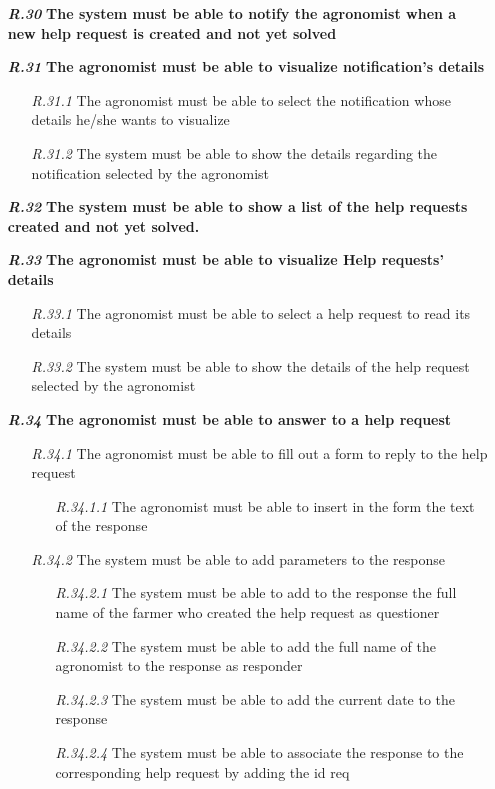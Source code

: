 \begin{itemize}
\item [\textbf{\textit{R.30}}] \textbf{The system must be able to notify the agronomist when a new help request is created and not yet solved}
\item [\textbf{\textit{R.31}}] \textbf{The agronomist must be able to visualize notification’s details}
        \begin{itemize}
            \item [\textit{R.31.1}] The agronomist must be able to select the notification whose details he/she wants to visualize
            \item [\textit{R.31.2}] The system must be able to show the details regarding the notification selected by the agronomist
        \end{itemize}
        \item [\textbf{\textit{R.32}}] \textbf{The system must be able to show a list of the help requests created and not yet solved.}
        \item [\textbf{\textit{R.33}}]\textbf{ The agronomist must be able to visualize Help requests' details}
        \begin{itemize}
            \item [\textit{R.33.1}] The agronomist must be able to select a help request to read its details
            \item [\textit{R.33.2}] The system must be able to show the details of the help request selected by the agronomist
        \end{itemize}
        \item [\textbf{\textit{R.34}}] \textbf{The agronomist must be able to answer to a help request}
        \begin{itemize}
            \item [\textit{R.34.1}] The agronomist must be able to fill out a form to reply to the help request
            \begin{itemize}
                \item [\textit{R.34.1.1}] The agronomist must be able to insert in the form the text of the response
            \end{itemize}
            \item [\textit{R.34.2}] The system must be able to add parameters to the response
            \begin{itemize}
                \item [\textit{R.34.2.1}] The system must be able to add to the response the full name of the farmer who created the help request as questioner
                \item [\textit{R.34.2.2}] The system must be able to add the full name of the agronomist to the response as responder
		        \item [\textit{R.34.2.3}] The system must be
		        able to add the current date to the response
		        \item [\textit{R.34.2.4}] The system must be able to associate the response to the corresponding help request by adding the id req
            \end{itemize}
        \end{itemize}



\end{itemize}
